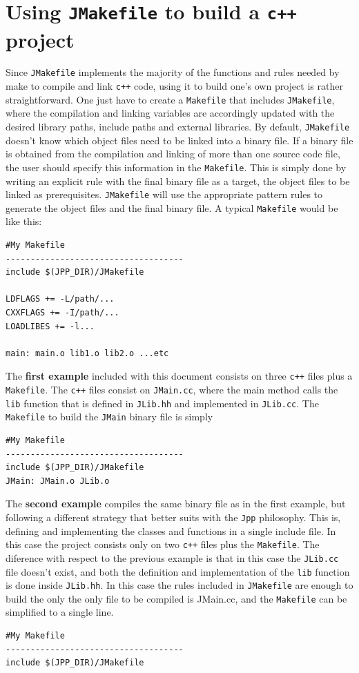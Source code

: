 \documentclass[t]{article}
\begin{document}
\section{Using {\tt JMakefile} to build a {\tt c++} project}
Since {\tt JMakefile} implements the majority of the functions and rules needed by make to compile and link {\tt c++} code, using it to build one's own project is rather straightforward. One just have to create a {\tt Makefile} that includes {\tt JMakefile}, where the compilation and linking variables are accordingly updated with the desired library paths, include paths and external libraries. By default, {\tt JMakefile} doesn't know which object files need to be linked into a binary file. If a binary file is obtained from the compilation and linking of more than one source code file, the user should specify this information in the {\tt Makefile}. This is simply done by writing an explicit rule with the final binary file as a target, the object files to be linked as prerequisites. {\tt JMakefile} will use the appropriate pattern rules to generate the object files and the final binary file. A typical {\tt Makefile} would be like this:

\begin{lstlisting}
#My Makefile
------------------------------------
include $(JPP_DIR)/JMakefile

LDFLAGS += -L/path/...
CXXFLAGS += -I/path/...
LOADLIBES += -l...

main: main.o lib1.o lib2.o ...etc
\end{lstlisting}

The \textbf{first example} included with this document consists on three {\tt c++} files plus a {\tt Makefile}. The {\tt c++} files consist on {\tt JMain.cc}, where the main method calls the {\tt lib} function that is defined in {\tt JLib.hh} and implemented in {\tt JLib.cc}. The {\tt Makefile} to build the {\tt JMain} binary file is simply 
\begin{lstlisting}
#My Makefile
------------------------------------
include $(JPP_DIR)/JMakefile
JMain: JMain.o JLib.o
\end{lstlisting}

The \textbf{second example} compiles the same binary file as in the first example, but following a different strategy that better suits with the {\tt Jpp} philosophy. This is, defining and implementing the classes and functions in a single include file. In this case the project consists only on two {\tt c++} files plus the {\tt Makefile}. The diference with respect to the previous example is that in this case the {\tt JLib.cc} file doesn't exist, and both the definition and implementation of the {\tt lib} function is done inside {\tt JLib.hh}. In this case the rules included in {\tt JMakefile} are enough to build the only the only file to be compiled is {JMain.cc}, and the {\tt Makefile} can be simplified to a single line. 
\newpage
\begin{lstlisting}
#My Makefile
------------------------------------
include $(JPP_DIR)/JMakefile
\end{lstlisting}
\end{document}
